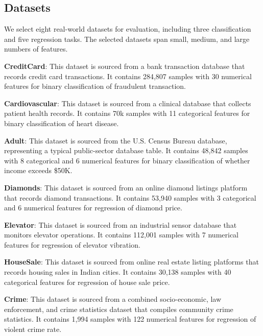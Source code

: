 \documentclass[sigconf, nonacm]{acmart}
\newcommand{\sydesi}[1]{{\color{black}#1}}
\newcommand{\syadd}[1]{{\color{black}#1}}
\newcommand{\vldb}[1]{{\color{red}#1}}
\newcommand*{\ourmodel}{CAIM}
\begin{document}
\subsection{Datasets}
We select \sydesi{eight} real-world datasets for evaluation, including three classification and \sydesi{five} regression tasks. \syadd{The selected datasets span small, medium, and large numbers of features.}

\noindent \textbf{CreditCard}: \vldb{This dataset is sourced from a bank transaction database that records credit card transactions. It contains 284,807 samples with 30 numerical features for binary classification of fraudulent transaction.}

\noindent \textbf{Cardiovascular}: \vldb{This dataset is sourced from a clinical database that collects patient health records. It contains 70k samples with 11 categorical features for binary classification of heart disease.}

\noindent \textbf{Adult}: \vldb{This dataset is sourced from the U.S. Census Bureau database, representing a typical public-sector database table. It contains 48,842 samples with 8 categorical and 6 numerical features for binary classification of whether income exceeds \$50K.}

\noindent \textbf{Diamonds}: \vldb{This dataset is sourced from an online diamond listings platform that records diamond transactions. It contains 53,940 samples with 3 categorical and 6 numerical features for regression of diamond price.}

\noindent \textbf{Elevator}: \vldb{This dataset is sourced from an industrial sensor database that monitors elevator operations. It contains 112,001 samples with 7 numerical features for regression of elevator vibration.}

\noindent \textbf{HouseSale}: \vldb{This dataset is sourced from online real estate listing platforms that records housing sales in Indian cities. It contains 30,138 samples with 40 categorical features for regression of house sale price.}

\noindent \textbf{Crime}: \vldb{This dataset is sourced from a combined socio-economic, law enforcement, and crime statistics dataset that compiles community crime statistics. It contains 1,994 samples with 122 numerical features for regression of violent crime rate.}
\end{document}
